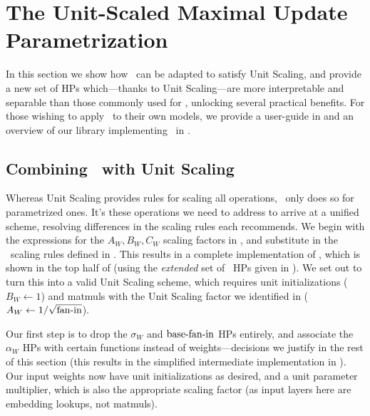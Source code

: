 \section{The Unit-Scaled Maximal Update Parametrization} \label{sec:umup}

In this section we show how \mup\ can be adapted to satisfy Unit Scaling, and provide a new set of HPs which---thanks to Unit Scaling---are more interpretable and separable than those commonly used for \mup, unlocking several practical benefits. For those wishing to apply \umup\ to their own models, we provide a user-guide in  and an overview of our library implementing \umup\ in .


\subsection{Combining \mup\ with Unit Scaling} \label{sec:umup:combining_mup_with_us}

Whereas Unit Scaling provides rules for scaling all operations, \mup\ only does so for parametrized ones. It's these operations we need to address to arrive at a unified scheme, resolving differences in the scaling rules each recommends. We begin with the expressions for the $A_W,B_W,C_W$ scaling factors in , and substitute in the \mup\ scaling rules defined in . This results in a complete implementation of \mup, which is shown in the top half of  (using the \textit{extended} set of \mup\ HPs given in ). We set out to turn this into a valid Unit Scaling scheme, which requires unit initializations ($B_W \leftarrow 1$) and matmuls with the Unit Scaling factor we identified in  ($A_W \leftarrow 1/\sqrt{\mathrm{fan{\text -}in}}$).

Our first step is to drop the $\sigma_W$ and $\mathrm{base{\text -}fan{\text -}in}$ HPs entirely, and associate the $\alpha_W$ HPs with certain functions instead of weights---decisions we justify in the rest of this section (this results in the simplified intermediate implementation in ). Our input weights now have unit initializations as desired, and a unit parameter multiplier, which is also the appropriate scaling factor (as input layers here are embedding lookups, not matmuls).

